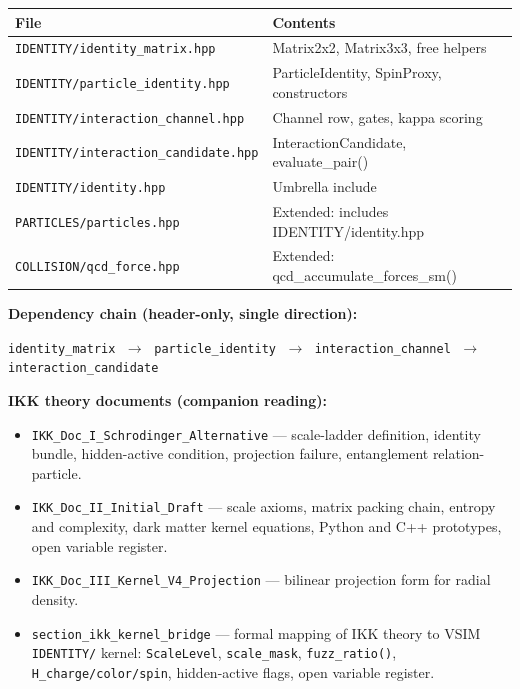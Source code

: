 \documentclass[11pt,a4paper]{article}
\theoremstyle{defbox}
\begin{document}
\begin{center}
\renewcommand{\arraystretch}{1.25}
\begin{tabular}{ll}
\toprule
\textbf{File} & \textbf{Contents} \\
\midrule
\texttt{IDENTITY/identity\_matrix.hpp}       & Matrix2x2, Matrix3x3, free helpers \\
\texttt{IDENTITY/particle\_identity.hpp}     & ParticleIdentity, SpinProxy, constructors \\
\texttt{IDENTITY/interaction\_channel.hpp}   & Channel row, gates, kappa scoring \\
\texttt{IDENTITY/interaction\_candidate.hpp} & InteractionCandidate, evaluate\_pair() \\
\texttt{IDENTITY/identity.hpp}               & Umbrella include \\
\texttt{PARTICLES/particles.hpp}             & Extended: includes IDENTITY/identity.hpp \\
\texttt{COLLISION/qcd\_force.hpp}            & Extended: qcd\_accumulate\_forces\_sm() \\
\bottomrule
\end{tabular}
\end{center}

\vspace{8pt}
\noindent\textbf{Dependency chain (header-only, single direction):}

\begin{center}
\texttt{identity\_matrix}
$\;\longrightarrow\;$ \texttt{particle\_identity}
$\;\longrightarrow\;$ \texttt{interaction\_channel}
$\;\longrightarrow\;$ \texttt{interaction\_candidate}
\end{center}

\vspace{8pt}
\noindent\textbf{IKK theory documents (companion reading):}
\begin{itemize}
  \item \texttt{IKK\_Doc\_I\_Schrodinger\_Alternative} ---
    scale-ladder definition, identity bundle, hidden-active condition,
    projection failure, entanglement relation-particle.
  \item \texttt{IKK\_Doc\_II\_Initial\_Draft} ---
    scale axioms, matrix packing chain, entropy and complexity,
    dark matter kernel equations, Python and C++ prototypes,
    open variable register.
  \item \texttt{IKK\_Doc\_III\_Kernel\_V4\_Projection} ---
    bilinear projection form for radial density.
  \item \texttt{section\_ikk\_kernel\_bridge} ---
    formal mapping of IKK theory to VSIM \texttt{IDENTITY/} kernel:
    \texttt{ScaleLevel}, \texttt{scale\_mask}, \texttt{fuzz\_ratio()},
    \texttt{H\_charge/color/spin}, hidden-active flags, open variable register.
\end{itemize}
\end{document}
